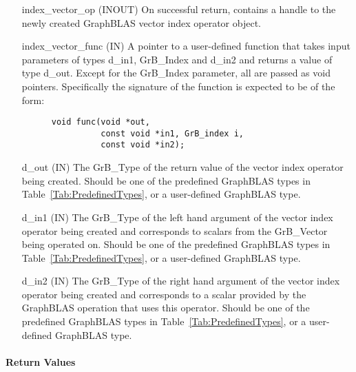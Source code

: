 \begin{itemize}[leftmargin=1.2in]
    \item[{\sf index\_vector\_op}] ({\sf INOUT}) On successful return, contains a 
          handle to the newly created GraphBLAS vector index operator object.
    \item[{\sf index\_vector\_func}] ({\sf IN}) A pointer to a user-defined function that 
          takes input parameters of types {\sf d\_in1}, {\sf GrB\_Index} and {\sf d\_in2}
          and returns a value of type {\sf d\_out}.  Except for the {\sf GrB\_Index}
          parameter, all are passed as {\sf void} pointers.
          Specifically the signature of the function is expected to 
          be of the form:
      \begin{verbatim}
      void func(void *out,
                const void *in1, GrB_index i, 
                const void *in2);
      \end{verbatim}
    \item[{\sf d\_out}]  ({\sf IN}) The {\sf GrB\_Type} of the return
          value of the vector index operator being created. Should be one of the
          predefined GraphBLAS types in Table~\ref{Tab:PredefinedTypes}, or a 
          user-defined GraphBLAS type.
    \item[{\sf d\_in1}]  ({\sf IN}) The {\sf GrB\_Type} of the left hand 
          argument of the vector index operator being created and corresponds to scalars 
          from the {\sf GrB\_Vector} being operated on. Should be one of the
          predefined GraphBLAS types in Table~\ref{Tab:PredefinedTypes}, or a
          user-defined GraphBLAS type.
    \item[{\sf d\_in2}]  ({\sf IN}) The {\sf GrB\_Type} of the right hand 
          argument of the vector index operator being created and corresponds to a
          scalar provided by the GraphBLAS operation that uses this operator. Should be one of the
          predefined GraphBLAS types in Table~\ref{Tab:PredefinedTypes}, or a 
          user-defined GraphBLAS type.
\end{itemize}

\paragraph{Return Values}

